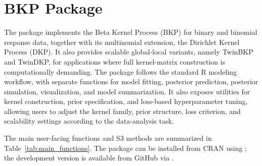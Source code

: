 \documentclass[article, shortnames]{jss}
\begin{document}
\section{BKP Package}\label{sec:package}

The  package \citep{Zhao2026BKP} implements the Beta Kernel Process (BKP) for binary and binomial response data, together with its multinomial extension, the Dirichlet Kernel Process (DKP). It also provides scalable global-local variants, namely TwinBKP and TwinDKP, for applications where full kernel-matrix construction is computationally demanding. The package follows the standard R modeling workflow, with separate functions for model fitting, posterior prediction, posterior simulation, visualization, and model summarization. It also exposes utilities for kernel construction, prior specification, and loss-based hyperparameter tuning, allowing users to adjust the kernel family, prior structure, loss criterion, and scalability settings according to the data-analysis task.

The main user-facing functions and S3 methods are summarized in Table~\ref{tab:main_functions}. The package can be installed from CRAN using ; the development version is available from GitHub via .
\end{document}
